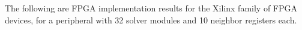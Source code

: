 \label{sec:ir}
The following are FPGA implementation results for the Xilinx family of FPGA devices, for a peripheral with 32 solver
modules and 10 neighbor registers each.

